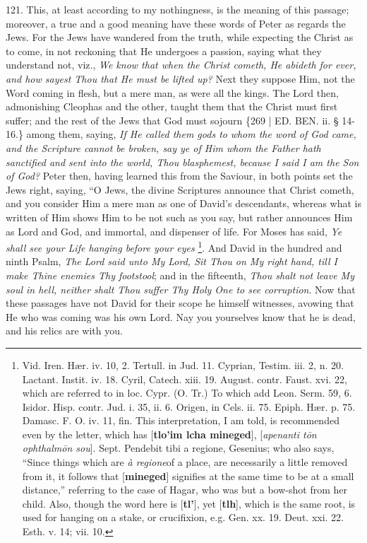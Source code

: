 121. This, at least according
to my nothingness, is the meaning of this passage; moreover, a true
and a good meaning have these words of Peter as regards the Jews. For
the Jews have wandered from the truth, while expecting the Christ as
to come, in not reckoning that He undergoes a passion, saying what
they understand not, viz., \emph{We know that when the Christ cometh, He
abideth for ever, and how sayest Thou that He must be lifted up?}
Next they suppose Him, not the Word coming in flesh, but a mere man,
as were all the kings. The Lord then, admonishing Cleophas and the
other, taught them that the Christ must first suffer; and the rest of
the Jews that God must sojourn \{269 | ED. BEN.
ii. § 14-16.\} among them, saying, \emph{If He called them gods to} \emph{whom
the word of God came, and the Scripture cannot be broken, say ye of
Him whom the Father hath sanctified and sent into the world, Thou
blasphemest, because I said I am the Son of God?} Peter then,
having learned this from the Saviour, in both points set the Jews
right, saying, ``O Jews, the divine Scriptures announce that Christ
cometh, and you consider Him a mere man as one of David's descendants,
whereas what is written of Him shows Him to be not such as you say,
but rather announces Him as Lord and God, and immortal, and dispenser
of life. For Moses has said, \emph{Ye shall see your Life hanging before
your eyes} \footnote{Vid. Iren. Hær. iv. 10, 2. Tertull. in Jud. 11. Cyprian, Testim. iii.
2, n. 20. Lactant. Instit. iv. 18. Cyril, Catech. xiii. 19. August.
contr. Faust. xvi. 22, which are referred to in loc. Cypr. (O. Tr.) To
which add Leon. Serm. 59, 6. Isidor. Hisp. contr. Jud. i. 35, ii. 6.
Origen, in Cels. ii. 75. Epiph. Hær. p. 75. Damasc. F. O. iv. 11,
fin. This interpretation, I am told, is recommended even by the
letter, which has [\textbf{tlo'im lcha mineged}], [\emph{apenanti t\={o}n
ophthalm\={o}n sou}]. Sept. Pendebit tibi a regione, Gesenius;
who also says, ``Since things which are \emph{à regione}of a place,
are necessarily a little removed from it, it follows that [\textbf{mineged}]
signifies at the same time to be at a small distance,'' referring to
the case of Hagar, who was but a bow-shot from her child. Also, though
the word here is [\textbf{tl'}], yet [\textbf{tlh}], which is the same
root, is used for hanging on a stake, or crucifixion, e.g. Gen. xx.
19. Deut. xxi. 22. Esth. v. 14; vii. 10.}. And David
in the hundred and ninth Psalm, \emph{The Lord said unto My Lord, Sit
Thou on My right hand, till I make Thine enemies Thy footstool};
and in the fifteenth, \emph{Thou shalt not leave My soul in hell, neither
shalt Thou suffer Thy Holy One to see corruption}. Now that these
passages have not David for their scope he himself witnesses, avowing
that He who was coming was his own Lord. Nay you yourselves know that
he is dead, and his relics are with you.

